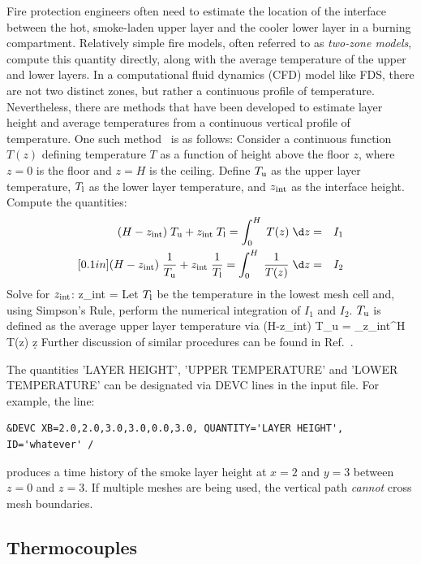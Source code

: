 \documentclass[11pt]{book}
\begin{document}
Fire protection engineers often need to estimate the location of the interface between the hot, smoke-laden upper layer and the cooler lower layer in a burning compartment.  Relatively simple fire models, often referred to as {\em two-zone models}, compute this quantity directly, along with the average temperature of the upper and lower layers.  In a computational fluid dynamics (CFD) model like FDS, there are not two distinct zones, but rather a continuous profile of temperature. Nevertheless, there are methods that have been developed to estimate layer height and average temperatures from a continuous vertical profile of temperature. One such method~\cite{Janssens:JFS1992} is as follows: Consider a continuous function $T(z)$ defining temperature $T$ as a function of height above the floor $z$, where $z=0$ is the floor and $z=H$ is the ceiling. Define $T_{\rm u}$ as the upper layer temperature, $T_{\rm l}$ as the lower layer temperature, and $z_{\rm int}$ as the interface height. Compute the quantities:
\begin{eqnarray*} (H-z_{\rm int})\; T_{\rm u} + z_{\rm int} \; T_{\rm l} = \int_0^H \; T(z) \; \d z &=& I_1 \\ [0.1in]
                  (H-z_{\rm int})\; \frac{1}{T_{\rm u}} + z_{\rm int} \; \frac{1}{T_{\rm l}} = \int_0^H \; \frac{1}{T(z)} \; \d z &=& I_2
\end{eqnarray*}
Solve for $z_{\rm int}$:
\be
   z_{\rm int} = 
\ee
Let $T_{\rm l}$ be the temperature in the lowest mesh cell and, using Simpson's Rule, perform the numerical integration of $I_1$ and $I_2$. $T_{\rm u}$ is defined as the average upper layer temperature via
\be
   (H-z_{\rm int})\; T_{\rm u} = \int_{z_{\rm int}}^H \; T(z) \; \d z
\ee
Further discussion of similar procedures can be found in Ref.~\cite{He:1}.

The quantities {\ct 'LAYER HEIGHT'}, {\ct 'UPPER TEMPERATURE'} and {\ct 'LOWER TEMPERATURE'} can be designated via {\ct DEVC} lines in the input file. For example, the line:
\begin{lstlisting}
&DEVC XB=2.0,2.0,3.0,3.0,0.0,3.0, QUANTITY='LAYER HEIGHT', ID='whatever' /
\end{lstlisting}
produces a time history of the smoke layer height at $x=2$ and $y=3$ between $z=0$ and $z=3$. If multiple meshes are being used, the vertical path {\em cannot} cross mesh boundaries.



\subsection{Thermocouples}
\label{info:THERMOCOUPLE}
\end{document}
